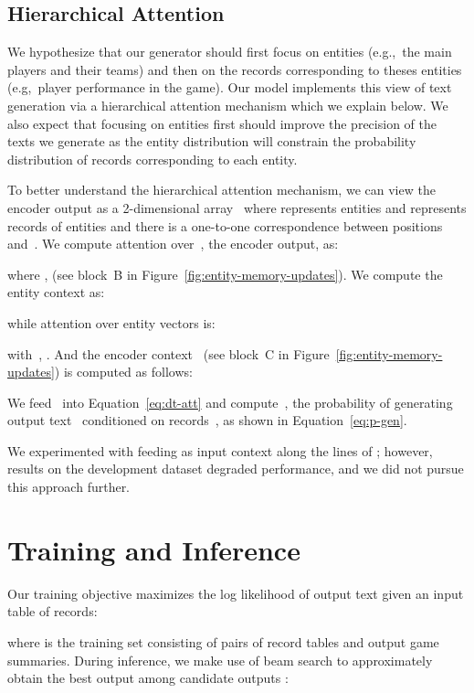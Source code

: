\documentclass[11pt,a4paper]{article}
\begin{document}
\subsection{Hierarchical Attention}
\label{sec:hier-attent}

We hypothesize that our generator should first focus on entities
(e.g.,~the main players and their teams) and then on the records
corresponding to theses entities (e.g,~player performance in the
game). Our model implements this view of text generation via a
hierarchical attention mechanism which we explain below. We also
expect that focusing on entities first should improve the precision of
the texts we generate as the entity distribution will constrain the
probability distribution of records corresponding to each entity.

To better understand the hierarchical attention mechanism, we can view
the encoder output  as a 2-dimensional
array~ where \mbox{} represents entities
and  represents records of entities and there is a
one-to-one correspondence between positions~ and~.  We
compute attention over~, the encoder output, as:

where ,
 (see block~B in
Figure~\ref{fig:entity-memory-updates}).  We compute the entity
context as:

while  attention over entity vectors  is:

with~,
 .
And the encoder context~ (see block~C in
 Figure~\ref{fig:entity-memory-updates}) is computed as follows:

We feed~ into Equation~\eqref{eq:dt-att} and
compute~, the probability of generating
output text~ conditioned on records~, as shown in
Equation~\eqref{eq:p-gen}.

We experimented with feeding  as input
context along the lines of ; however, results on the
development dataset degraded performance, and we did not pursue this
approach further.

\section{Training and Inference}
Our training objective maximizes the log likelihood of output text
given an input table of records:

where  is the training set consisting of pairs of record
tables and output game summaries.  During inference, we make use of
beam search to approximately obtain the best output  among
candidate outputs :
\end{document}
